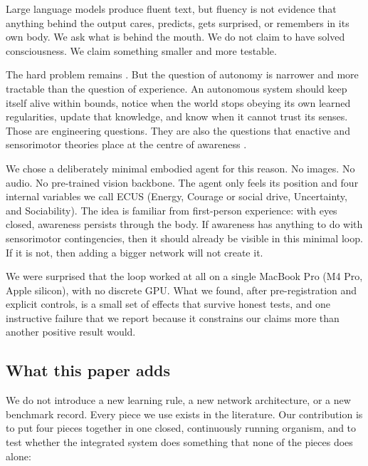 \documentclass[11pt,a4paper]{article}
\begin{document}
Large language models produce fluent text, but fluency is not evidence that anything behind the output cares, predicts, gets surprised, or remembers in its own body. We ask what is behind the mouth. We do not claim to have solved consciousness. We claim something smaller and more testable.

The hard problem remains \cite{chalmers1995}. But the question of autonomy is narrower and more tractable than the question of experience. An autonomous system should keep itself alive within bounds, notice when the world stops obeying its own learned regularities, update that knowledge, and know when it cannot trust its senses. Those are engineering questions. They are also the questions that enactive and sensorimotor theories place at the centre of awareness \cite{oregan2001, thompson2007}.

We chose a deliberately minimal embodied agent for this reason. No images. No audio. No pre-trained vision backbone. The agent only feels its position and four internal variables we call ECUS (Energy, Courage or social drive, Uncertainty, and Sociability). The idea is familiar from first-person experience: with eyes closed, awareness persists through the body. If awareness has anything to do with sensorimotor contingencies, then it should already be visible in this minimal loop. If it is not, then adding a bigger network will not create it.

We were surprised that the loop worked at all on a single MacBook Pro (M4 Pro, Apple silicon), with no discrete GPU. What we found, after pre-registration and explicit controls, is a small set of effects that survive honest tests, and one instructive failure that we report because it constrains our claims more than another positive result would.

\subsection{What this paper adds}

We do not introduce a new learning rule, a new network architecture, or a new benchmark record. Every piece we use exists in the literature. Our contribution is to put four pieces together in one closed, continuously running organism, and to test whether the integrated system does something that none of the pieces does alone:
\end{document}
